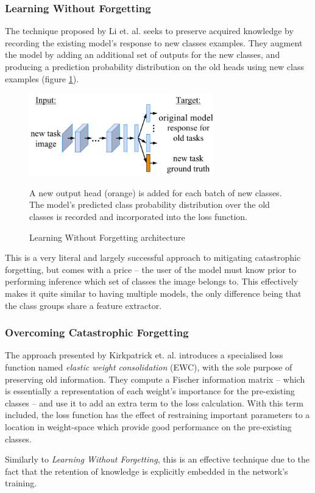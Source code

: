 \documentclass{report}
\begin{document}
	\subsubsection{Learning Without Forgetting}
	The technique proposed by Li et. al. \parencite{lwf} seeks to preserve acquired knowledge by recording the existing model's response to new classes examples. They augment the model by adding an additional set of outputs for the new classes, and producing a prediction probability distribution on the old heads using new class examples (figure \ref{fig:lwf:1}). \par
	\begin{figure}[h]
		\centering
		\includegraphics[width=8cm]{lwfarchitecture}
		\caption{Learning Without Forgetting architecture}
		A new output head (orange) is added for each batch of new classes. The model's predicted class probability distribution over the old classes is recorded and incorporated into the loss function. 
		\label{fig:lwf:1}
	\end{figure}
	This is a very literal and largely successful approach to mitigating catastrophic forgetting, but comes with a price -- the user of the model must know prior to performing inference which set of classes the image belongs to. This effectively makes it quite similar to having multiple models, the only difference being that the class groups share a feature extractor. \par

	\subsubsection{Overcoming Catastrophic Forgetting}
	The approach presented by Kirkpatrick et. al. \parencite{lwf} introduces a specialised loss function named \emph{elastic weight consolidation} (EWC), with the sole purpose of preserving old information. They compute a Fischer information matrix -- which is essentially a representation of each weight's importance for the pre-existing classes -- and use it to add an extra term to the loss calculation. With this term included, the loss function has the effect of restraining important parameters to a location in weight-space which provide good performance on the pre-existing classes. \par
	Similarly to \emph{Learning Without Forgetting}, this is an effective technique due to the fact that the retention of knowledge is explicitly embedded in the network's training. \par
	\par
	
\end{document}
